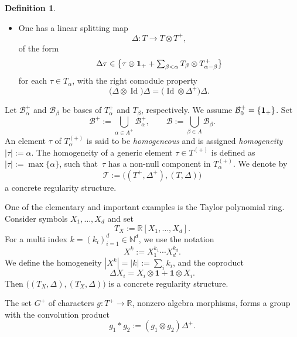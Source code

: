 \documentclass[10pt]{amsart}
\theoremstyle{plain}
\theoremstyle{definition}
\newtheorem*{defn*} {Definition}
\DeclareMathOperator{\iden}{Id}
\newcommand{\unit}{\mathbf{1}}
\newcommand{\bbN}{\mathbb{N}}
\newcommand{\bbR}{\mathbb{R}}
\newcommand{\mcB}{\mathcal{B}}
\begin{document}
\begin{defn*}
\begin{itemize}
\item One has a linear splitting map\vspace*{-3pt}
\[
\Delta : T \to T\otimes T^+,
\]
of the form\vspace*{-3pt}
\begin{equation}
\label{EqDelta}
\Delta \tau \in \bigl\{\tau\otimes {\bf 1}_+ + \textstyle\sum_{\beta<\alpha} T_\beta\otimes T^+_{\alpha-\beta}\bigr\}
\end{equation}
for each $\tau\in T_\alpha$, with the right comodule property\vspace*{-3pt}
\begin{equation*}
\bigl(\Delta\otimes \iden\bigr)\Delta = \bigl(\iden\otimes \Delta^+\bigr)\Delta.
\end{equation*}
\end{itemize}
Let $\mcB_\alpha^+$ and $\mcB_\beta$ be bases of $T_\alpha^+$ and $T_\beta$, respectively. We assume $\mcB_0^+=\{{\bf1}_+\}$. Set\vspace*{-1pt}
\[
\mcB^+ := \bigcup_{\alpha\in A^+} \mcB_\alpha^+, \qquad \mcB := \bigcup_{\beta\in A} \mcB_\beta.
\]
An element $\tau$ of $T_\alpha^{(+)}$ is said to be \emph{homogeneous} and is assigned \emph{{homogeneity}} $|\tau| := \alpha$. The homogeneity of a generic element $\tau\in T^{(+)}$ is defined as $|\tau| := \max\{\alpha\}$, such that~$\tau$ has a non-null component in $T^{(+)}_\alpha$.
We denote by\vspace*{-3pt}
\[
\mathscr{T} := \bigl((T^+,\Delta^+), (T,\Delta)\bigr)
\]
a concrete regularity structure.
\end{defn*}

One of the elementary and important examples is the Taylor polynomial ring. Consider symbols $X_1, \dots, X_d$ and set\vspace*{-3pt}
\[
T_X := \bbR[X_1,\dots, X_d].
\]
For a multi index $k=(k_i)_{i=1}^d\in\bbN^d$, we use the notation\vspace*{-3pt}
\[
X^k := X_1^{k_1}\cdots X_d^{k_d}.
\]
We define the homogeneity $|X^k|=|k|:=\sum_ik_i$, and the coproduct\vspace*{-1pt}
\begin{equation} \label{EqCoproductPolynomials}
\Delta X_i=X_i\otimes\unit+\unit\otimes X_i.
\end{equation}
Then $\bigl((T_X,\Delta),(T_X,\Delta)\bigr)$ is a concrete regularity structure.

The set $G^+$ of characters $g : T^+\to\bbR$, \ie nonzero algebra morphisms, forms a group with the convolution product\vspace*{-3pt}
\[
g_1*g_2:=(g_1\otimes g_2)\Delta^+.
\]
\end{document}
